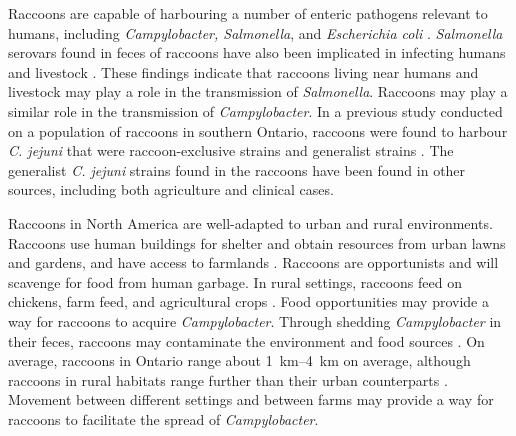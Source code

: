 \documentclass[letterpaper,titlepage,12pt]{article}
\begin{document}
 Raccoons are capable of harbouring a number of enteric pathogens relevant to humans, including \textit{Campylobacter, Salmonella}, and \textit{Escherichia coli} \parencite{bondo2016impact, jardine2012antimicrobial, bondo2016epidemiology}. \textit{Salmonella} serovars found in feces of raccoons have also been implicated in infecting humans and livestock \parencite{bondo2016impact}. These findings indicate that raccoons living near humans and livestock may play a role in the transmission of \textit{Salmonella}. Raccoons may play a similar role in the transmission of \textit{Campylobacter}. In a previous study conducted on a population of raccoons in southern Ontario, raccoons were found to harbour \textit{C. jejuni} that were raccoon-exclusive strains and generalist strains \parencite{mutschall2020campylobacter}. The generalist \textit{C. jejuni} strains found in the raccoons have been found in other sources, including both agriculture and clinical cases. 

Raccoons in North America are well-adapted to urban and rural environments. Raccoons use human buildings for shelter and obtain resources from urban lawns and gardens, and have access to farmlands \parencite{rosatte2010density}. Raccoons are opportunists and will scavenge for food from human garbage. In rural settings, raccoons feed on chickens, farm feed, and agricultural crops \parencite{tyler2015notes}. Food opportunities may provide a way for raccoons to acquire \textit{Campylobacter}. Through shedding \textit{Campylobacter} in their feces, raccoons may contaminate the environment and food sources \parencite{BondoKristinJ2019SCCd}. On average, raccoons in Ontario range about \SIrange[range-units=single]{1}{4}{\km} on average, although raccoons in rural habitats range further than their urban counterparts \parencite{rosatte2000management, rosatte2010density}. Movement between different settings and between farms may provide a way for raccoons to facilitate the spread of \textit{Campylobacter}.   %

   
\end{document}
